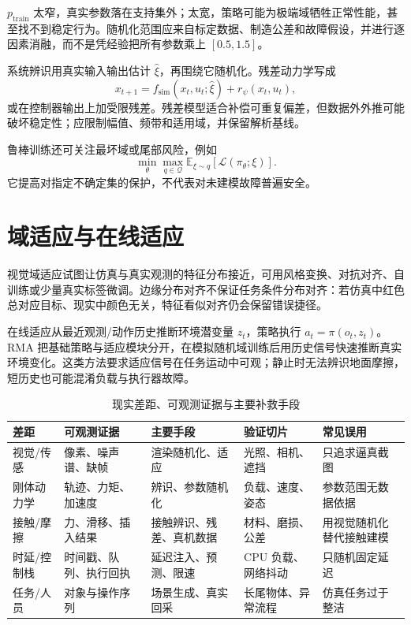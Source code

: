 $p_{\mathrm{train}}$ 太窄，真实参数落在支持集外；太宽，策略可能为极端域牺牲正常性能，甚至找不到稳定行为。随机化范围应来自标定数据、制造公差和故障假设，并进行逐因素消融，而不是凭经验把所有参数乘上 $[0.5,1.5]$。

系统辨识用真实输入输出估计 $\hat\xi$，再围绕它随机化。残差动力学写成
\begin{equation}
x_{t+1}=f_{\mathrm{sim}}(x_t,u_t;\hat\xi)+r_\psi(x_t,u_t),
\label{eq:residual-dynamics}
\end{equation}
或在控制器输出上加受限残差。残差模型适合补偿可重复偏差，但数据外外推可能破坏稳定性；应限制幅值、频带和适用域，并保留解析基线。

鲁棒训练还可关注最坏域或尾部风险，例如
\begin{equation}
\min_\theta\max_{q\in\mathcal Q}
\mathbb E_{\xi\sim q}[\mathcal L(\pi_\theta;\xi)].
\end{equation}
它提高对指定不确定集的保护，不代表对未建模故障普遍安全。

\section{域适应与在线适应}

视觉域适应试图让仿真与真实观测的特征分布接近，可用风格变换、对抗对齐、自训练或少量真实标签微调。边缘分布对齐不保证任务条件分布对齐：若仿真中红色总对应目标、现实中颜色无关，特征看似对齐仍会保留错误捷径。

在线适应从最近观测/动作历史推断环境潜变量 $z_t$，策略执行 $a_t=\pi(o_t,z_t)$。RMA 把基础策略与适应模块分开，在模拟随机域训练后用历史信号快速推断真实环境变化\cite{kumar2021rma}。这类方法要求适应信号在任务运动中可观；静止时无法辨识地面摩擦，短历史也可能混淆负载与执行器故障。

\begin{table}[H]
\centering
\caption{现实差距、可观测证据与主要补救手段}
\label{tab:sim2real-gap-matrix}
\begin{tabularx}{\textwidth}{p{}YYYp{0.23\textwidth}}
\toprule
差距 & 可观测证据 & 主要手段 & 验证切片 & 常见误用 \\
\midrule
视觉/传感 & 像素、噪声谱、缺帧 & 渲染随机化、适应 & 光照、相机、遮挡 & 只追求逼真截图 \\
刚体动力学 & 轨迹、力矩、加速度 & 辨识、参数随机化 & 负载、速度、姿态 & 参数范围无数据依据 \\
接触/摩擦 & 力、滑移、插入结果 & 接触辨识、残差、真机数据 & 材料、磨损、公差 & 用视觉随机化替代接触建模 \\
时延/控制栈 & 时间戳、队列、执行回执 & 延迟注入、预测、限速 & CPU 负载、网络抖动 & 只随机固定延迟 \\
任务/人员 & 对象与操作序列 & 场景生成、真实回采 & 长尾物体、异常流程 & 仿真任务过于整洁 \\
\bottomrule
\end{tabularx}
\end{table}

